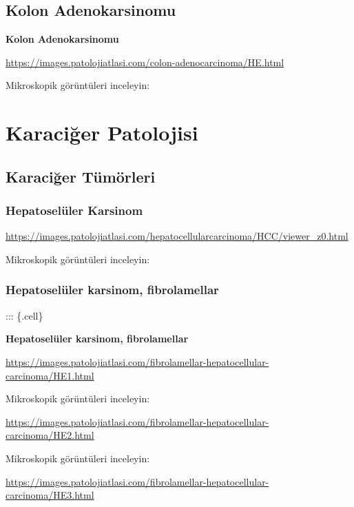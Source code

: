 \documentclass[
  letterpaper,
  DIV=11,
  numbers=noendperiod]{scrreprt}
\begin{document}
\hypertarget{kolon-adenokarsinomu}{%
\chapter{Kolon Adenokarsinomu}\label{kolon-adenokarsinomu}}

\textbf{Kolon Adenokarsinomu}

\url{https://images.patolojiatlasi.com/colon-adenocarcinoma/HE.html}

Mikroskopik görüntüleri inceleyin:

\part{Karaciğer Patolojisi}

\hypertarget{karaciux11fer-tuxfcmuxf6rleri}{%
\chapter{Karaciğer Tümörleri}\label{karaciux11fer-tuxfcmuxf6rleri}}

\hypertarget{hepatoseluxfcler-karsinom}{%
\section{Hepatoselüler Karsinom}\label{hepatoseluxfcler-karsinom}}

\url{https://images.patolojiatlasi.com/hepatocellularcarcinoma/HCC/viewer_z0.html}

Mikroskopik görüntüleri inceleyin:

\hypertarget{hepatoseluxfcler-karsinom-fibrolamellar}{%
\section{Hepatoselüler karsinom,
fibrolamellar}\label{hepatoseluxfcler-karsinom-fibrolamellar}}

::: \{.cell\}

\textbf{Hepatoselüler karsinom, fibrolamellar}

\url{https://images.patolojiatlasi.com/fibrolamellar-hepatocellular-carcinoma/HE1.html}

Mikroskopik görüntüleri inceleyin:

\url{https://images.patolojiatlasi.com/fibrolamellar-hepatocellular-carcinoma/HE2.html}

Mikroskopik görüntüleri inceleyin:

\url{https://images.patolojiatlasi.com/fibrolamellar-hepatocellular-carcinoma/HE3.html}
\end{document}
